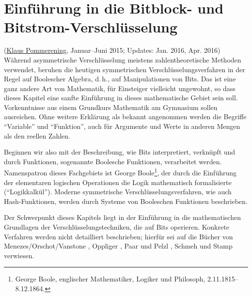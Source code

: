 \begin{refsegment}
\sloppy
\frenchspacing

\setcounter{satz}{0}
\setcounter{definition}{0}


\newpage %
\hypertarget{Chapter_BitCiphers}{}   %
\chapter{Einführung in die Bitblock- und Bitstrom-Verschlüsselung}
\label{Chapter_BitCiphers}
(\hyperlink{author_Klaus-Pommerening}{Klaus Pommerening},
 Januar--Juni 2015; Updates: Jan. 2016, Apr. 2016) \\

\noindent
Während asymmetrische Verschlüsselung meistens zahlentheoretische Methoden
verwendet, beruhen die heutigen symmetrischen
Verschlüsselungsverfahren
in der Regel auf Boolescher Algebra,
d.\,h., auf Manipulationen von Bits.
Das ist eine ganz andere Art von Mathematik, für Einsteiger vielleicht
ungewohnt, so dass dieses Kapitel eine sanfte Einführung in dieses mathematische
Gebiet sein soll. Vorkenntnisse aus einem Grundkurs Mathematik am Gymnasium
sollen ausreichen. Ohne weitere Erklärung als bekannt
angenommen werden die Begriffe "`Variable"' und "`Funktion"', auch für Argumente
und Werte in anderen Mengen als den reellen Zahlen.

Beginnen wir also mit der Beschreibung, wie Bits interpretiert, verknüpft
und durch Funktionen, sogenannte Boolesche
Funktionen, verarbeitet werden.
Namenspatron dieses Fachgebiets ist
George Boole\footnote{%
  George Boole, englischer Mathematiker, Logiker und Philosoph,
  2.11.1815--8.12.1864.
},
der durch die Einführung der elementaren logischen Operationen die Logik
mathematisch formalisierte ("`Logikkalkül"').
Moderne symmetrische Verschlüsselungsverfahren, wie auch
Hash-Funktionen,
werden durch Systeme von Booleschen Funktionen beschrieben.

Der Schwerpunkt dieses Kapitels liegt in der Einführung in die
mathematischen Grundlagen der Verschlüsselungstechniken, die auf
Bits operieren. Konkrete Verfahren werden nicht detailliert beschrieben;
hierfür sei auf die Bücher von
Menezes/Orschot/Vanstone \cite{Menezes2001},
Oppliger \cite{Oppliger2011},
Paar und Pelzl \cite{PaPe2009},
Schmeh \cite{Schm2003, Schm2016}
und Stamp \cite{Stamp2007} verwiesen.


\end{refsegment}
